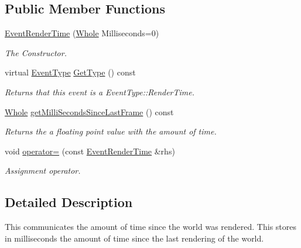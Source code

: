 \subsection*{Public Member Functions}
\begin{DoxyCompactItemize}
\item 
\hyperlink{classphys_1_1EventRenderTime_a104e523bc0d33c013aedab7fe10176b3}{EventRenderTime} (\hyperlink{namespacephys_a460f6bc24c8dd347b05e0366ae34f34a}{Whole} Milliseconds=0)
\begin{DoxyCompactList}\small\item\em The Constructor. \item\end{DoxyCompactList}\item 
virtual \hyperlink{classphys_1_1EventBase_a5e6a8564e127f654123f0bf6a2751923}{EventType} \hyperlink{classphys_1_1EventRenderTime_a160ca55bf9e5a2ae80dab82eab88baf5}{GetType} () const 
\begin{DoxyCompactList}\small\item\em Returns that this event is a EventType::RenderTime. \item\end{DoxyCompactList}\item 
\hyperlink{namespacephys_a460f6bc24c8dd347b05e0366ae34f34a}{Whole} \hyperlink{classphys_1_1EventRenderTime_a0227bea32aeeb214ef9abc17e55fa8eb}{getMilliSecondsSinceLastFrame} () const 
\begin{DoxyCompactList}\small\item\em Returns the a floating point value with the amount of time. \item\end{DoxyCompactList}\item 
void \hyperlink{classphys_1_1EventRenderTime_a329a34e064ab7f67c5c9eff517a560fc}{operator=} (const \hyperlink{classphys_1_1EventRenderTime}{EventRenderTime} \&rhs)
\begin{DoxyCompactList}\small\item\em Assignment operator. \item\end{DoxyCompactList}\end{DoxyCompactItemize}


\subsection{Detailed Description}
This communicates the amount of time since the world was rendered. This stores in milliseconds the amount of time since the last rendering of the world. 

